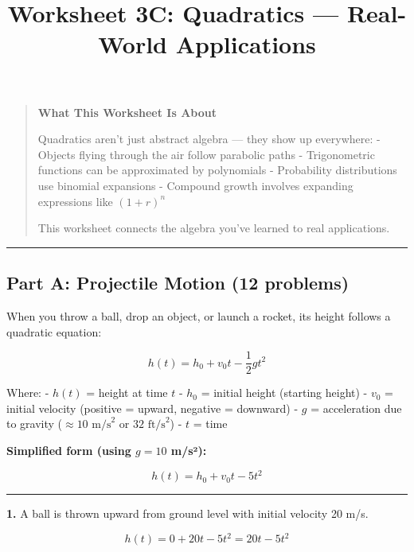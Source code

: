 \documentclass[
  11pt,
]{article}
\title{Worksheet 3C: Quadratics --- Real-World Applications}
\author{}
\date{}
\begin{document}
\maketitle

\begin{quote}
\textbf{What This Worksheet Is About}

Quadratics aren't just abstract algebra --- they show up everywhere: -
Objects flying through the air follow parabolic paths - Trigonometric
functions can be approximated by polynomials - Probability distributions
use binomial expansions - Compound growth involves expanding expressions
like \((1 + r)^n\)

This worksheet connects the algebra you've learned to real applications.
\end{quote}

\begin{center}\rule{0.5\linewidth}{0.5pt}\end{center}

\hypertarget{part-a-projectile-motion-12-problems}{%
\subsection{Part A: Projectile Motion (12
problems)}\label{part-a-projectile-motion-12-problems}}

When you throw a ball, drop an object, or launch a rocket, its height
follows a quadratic equation:

\[h(t) = h_0 + v_0 t - \frac{1}{2}gt^2\]

Where: - \(h(t)\) = height at time \(t\) - \(h_0\) = initial height
(starting height) - \(v_0\) = initial velocity (positive = upward,
negative = downward) - \(g\) = acceleration due to gravity
(\(\approx 10 \text{ m/s}^2\) or \(32 \text{ ft/s}^2\)) - \(t\) = time

\textbf{Simplified form (using \(g = 10\) m/s²):}

\[h(t) = h_0 + v_0 t - 5t^2\]

\begin{center}\rule{0.5\linewidth}{0.5pt}\end{center}

\textbf{1.} A ball is thrown upward from ground level with initial
velocity 20 m/s.

\[h(t) = 0 + 20t - 5t^2 = 20t - 5t^2\]
\end{document}
